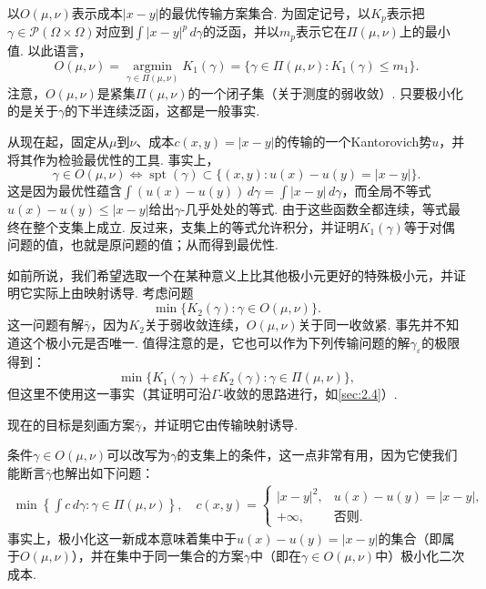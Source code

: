 以$O(\mu,\nu)$表示成本$|x-y|$的最优传输方案集合. 为固定记号，以$K_p$表示把$\gamma\in\mathscr P(\Omega\times\Omega)$对应到$\int|x-y|^p\,d\gamma$的泛函，并以$m_p$表示它在$\Pi(\mu,\nu)$上的最小值. 以此语言，
\[
O(\mu,\nu)=\operatorname*{argmin}_{\gamma\in\Pi(\mu,\nu)}K_1(\gamma)
=\{\gamma\in\Pi(\mu,\nu):K_1(\gamma)\le m_1\}.
\]
注意，$O(\mu,\nu)$是紧集$\Pi(\mu,\nu)$的一个闭子集（关于测度的弱收敛）. 只要极小化的是关于$\gamma$的下半连续泛函，这都是一般事实.

从现在起，固定从$\mu$到$\nu$、成本$c(x,y)=|x-y|$的传输的一个Kantorovich势$u$，并将其作为检验最优性的工具. 事实上，
\begin{equation}\label{eq:3.2}
\gamma\in O(\mu,\nu)\iff\operatorname{spt}(\gamma)\subset
\{(x,y):u(x)-u(y)=|x-y|\}.
\end{equation}
这是因为最优性蕴含$\int(u(x)-u(y))\,d\gamma=\int|x-y|\,d\gamma$，而全局不等式$u(x)-u(y)\le|x-y|$给出$\gamma$-几乎处处的等式. 由于这些函数全都连续，等式最终在整个支集上成立. 反过来，支集上的等式允许积分，并证明$K_1(\gamma)$等于对偶问题的值，也就是原问题的值；从而得到最优性.

如前所说，我们希望选取一个在某种意义上比其他极小元更好的特殊极小元，并证明它实际上由映射诱导. 考虑问题
\[
\min\{K_2(\gamma):\gamma\in O(\mu,\nu)\}.
\]
这一问题有解$\bar\gamma$，因为$K_2$关于弱收敛连续，$O(\mu,\nu)$关于同一收敛紧. 事先并不知道这个极小元是否唯一. 值得注意的是，它也可以作为下列传输问题的解$\gamma_\varepsilon$的极限得到：
\[
\min\{K_1(\gamma)+\varepsilon K_2(\gamma):\gamma\in\Pi(\mu,\nu)\},
\]
\label{idx:i5-p90}
但这里不使用这一事实（其证明可沿$\Gamma$-收敛的思路进行，如\autoref{sec:2.4}）.

现在的目标是刻画方案$\bar\gamma$，并证明它由传输映射诱导.

条件$\gamma\in O(\mu,\nu)$可以改写为$\gamma$的支集上的条件，这一点非常有用，因为它使我们能断言$\bar\gamma$也解出如下问题：
\begin{equation*}
\begin{aligned}
\min\left\{\int c\,d\gamma:\gamma\in\Pi(\mu,\nu)\right\},\quad
c(x,y)=\begin{cases}|x-y|^2,&u(x)-u(y)=|x-y|,\\+\infty,&\text{否则}.\end{cases}
\end{aligned}
\end{equation*}
事实上，极小化这一新成本意味着集中于$u(x)-u(y)=|x-y|$的集合（即属于$O(\mu,\nu)$），并在集中于同一集合的方案$\gamma$中（即在$\gamma\in O(\mu,\nu)$中）极小化二次成本.

